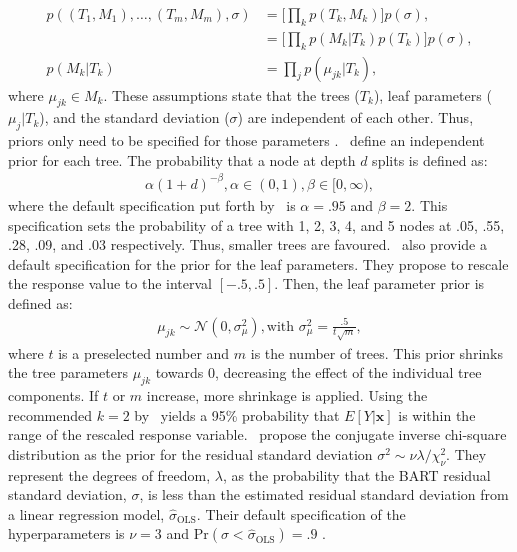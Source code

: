 \documentclass[10pt, a4paper, titlepage]{article}
\begin{document}
\begin{subequations}
\begin{align}
\label{eq:independence_prior}
    p((T_1, M_1), \dots, (T_m, M_m), \sigma) &= \Big[\prod_{k}p(T_k, M_k)\Big]p(\sigma), \\
    &= \Big[\prod_{k}p(M_k|T_k)p(T_k)\Big]p(\sigma), \\
    p(M_k|T_k) &= \prod_{j}p(\mu_{jk}|T_k),
\end{align}
\end{subequations} where $\mu_{jk} \in M_k$. These assumptions state that the trees ($T_{k}$), leaf parameters ($\mu_{j}|T_{k}$), and the standard deviation ($\sigma$) are independent of each other. Thus, priors only need to be specified for those parameters \citep{chipman2010, hill2020, chipman2006, chipman1998}.~\citet{chipman1998} define an independent prior for each tree. The probability that a node at depth $d$ splits is defined as: 
\begin{align}
\label{eq:tree_prior}
    \alpha(1+d)^{-\beta}, \alpha \in (0,1), \beta \in [0, \infty),
\end{align} where the default specification put forth by~\citet{chipman2006,chipman2010} is $\alpha = .95$ and $\beta = 2$. This specification sets the probability of a tree with 1, 2, 3, 4, and 5 nodes at .05, .55, .28, .09, and .03 respectively. Thus, smaller trees are favoured.~\citet{chipman2006,chipman2010} also provide a default specification for the prior for the leaf parameters. They propose to rescale the response value to the interval $[-.5,.5]$. Then, the leaf parameter prior is defined as: 
\begin{align}
\label{eq:leaf_prior}
    \mu_{jk} \sim \mathcal{N}(0, \sigma^2_{\mu}), \text{with } \sigma^2_{\mu} = \frac{.5}{t\sqrt{m}},
\end{align} where $t$ is a preselected number and $m$ is the number of trees. This prior shrinks the tree parameters $\mu_{jk}$ towards 0, decreasing the effect of the individual tree components. If $t$ or $m$ increase, more shrinkage is applied. Using the recommended $k = 2$ by~\citet{chipman2006,chipman2010} yields a 95\% probability that $E[Y|\mathbf{x}]$ is within the range of the rescaled response variable.~\citet{chipman2006,chipman2010} propose the conjugate inverse chi-square distribution as the prior for the residual standard deviation $\sigma^2 \sim \nu\lambda/\chi^{2}_{\nu}$. They represent the degrees of freedom, $\lambda$, as the probability that the BART residual standard deviation, $\sigma$, is less than the estimated residual standard deviation from a linear regression model, $\hat{\sigma}_\text{OLS}$. Their default specification of the hyperparameters is $\nu = 3$ and $\text{Pr}(\sigma < \hat{\sigma}_\text{OLS}) = .9$ \citep{chipman2010, hill2020, chipman2006, chipman1998}.
\end{document}
